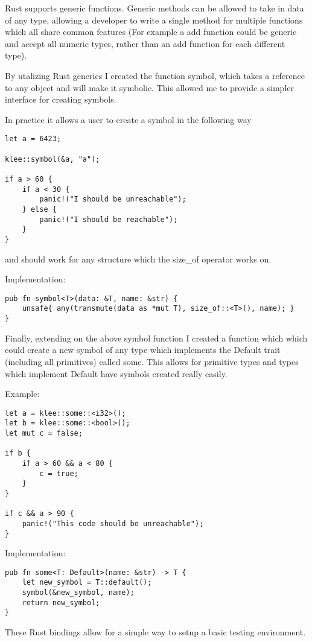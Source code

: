 \documentclass{report}
\begin{document}
Rust supports generic functions. Generic methods can be allowed to take in data of any type, allowing a developer to write a single method for multiple functions which all share common features (For example a add function could be generic and accept all numeric types, rather than an add function for each different type).

By utalizing Rust generics I created the function symbol, which takes a reference to any object and will make it symbolic. This allowed me to provide a simpler interface for creating symbols.

In practice it allows a user to create a symbol in the following way

\begin {lstlisting}
let a = 6423;

klee::symbol(&a, "a");

if a > 60 {
	if a < 30 {
		panic!("I should be unreachable");
	} else {
		panic!("I should be reachable");
	}
}
\end{lstlisting}

and should work for any structure which the size\_of operator works on.

Implementation:
\begin {lstlisting}
pub fn symbol<T>(data: &T, name: &str) {
    unsafe{ any(transmute(data as *mut T), size_of::<T>(), name); }
}
\end{lstlisting}

Finally, extending on the above symbol function I created a function which which could create a new symbol of any type which implements the Default trait (including all primitives) called some. This allows for primitive types and types which implement Default have symbols created really easily.

Example:
\begin{lstlisting}
let a = klee::some::<i32>();
let b = klee::some::<bool>();
let mut c = false;

if b {
	if a > 60 && a < 80 {
		c = true;
	}
}

if c && a > 90 {
	panic!("This code should be unreachable");
}
\end{lstlisting}

Implementation:
\begin{lstlisting}
pub fn some<T: Default>(name: &str) -> T {
    let new_symbol = T::default();
    symbol(&new_symbol, name);
    return new_symbol;
}
\end{lstlisting}

These Rust bindings allow for a simple way to setup a basic testing environment.
\end{document}
